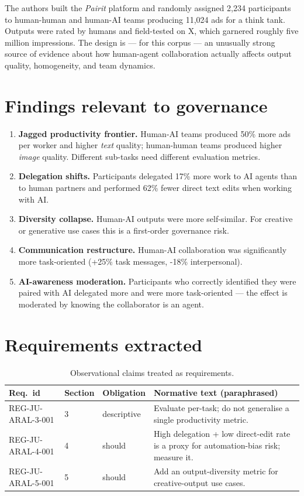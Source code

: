 \documentclass[11pt,a4paper,twoside]{report}
\begin{document}
The authors built the \emph{Pairit} platform and randomly assigned 2{,}234
participants to human-human and human-AI teams producing 11{,}024 ads
for a think tank. Outputs were rated by humans and field-tested on X,
which garnered roughly five million impressions. The design is --- for
this corpus --- an unusually strong source of evidence about how
human-agent collaboration actually affects output quality, homogeneity,
and team dynamics.

\section{Findings relevant to governance}

\begin{enumerate}
\item \textbf{Jagged productivity frontier.} Human-AI teams produced
50\% more ads per worker and higher \emph{text} quality;
human-human teams produced higher \emph{image} quality. Different
sub-tasks need different evaluation metrics.
\item \textbf{Delegation shifts.} Participants delegated 17\% more work
to AI agents than to human partners and performed 62\% fewer
direct text edits when working with AI.
\item \textbf{Diversity collapse.} Human-AI outputs were more
self-similar. For creative or generative use cases this is a
first-order governance risk.
\item \textbf{Communication restructure.} Human-AI collaboration was
significantly more task-oriented (+25\% task messages, -18\%
interpersonal).
\item \textbf{AI-awareness moderation.} Participants who correctly
identified they were paired with AI delegated more and were more
task-oriented --- the effect is moderated by knowing the
collaborator is an agent.
\end{enumerate}

\section{Requirements extracted}

\begin{table}[h]
\centering
\small
\begin{tabularx}{\textwidth}{p{3.2cm}p{1.4cm}p{1.6cm}X}
\toprule
\textbf{Req.\ id} & \textbf{Section} & \textbf{Obligation} & \textbf{Normative text (paraphrased)} \\
\midrule
REG-JU-ARAL-3-001 & 3 & descriptive & Evaluate per-task; do not generalise a single productivity metric. \\
REG-JU-ARAL-4-001 & 4 & should & High delegation + low direct-edit rate is a proxy for automation-bias risk; measure it. \\
REG-JU-ARAL-5-001 & 5 & should & Add an output-diversity metric for creative-output use cases. \\
\bottomrule
\end{tabularx}
\caption{Observational claims treated as requirements.}
\label{tab:jural-reqs}
\end{table}
\end{document}
